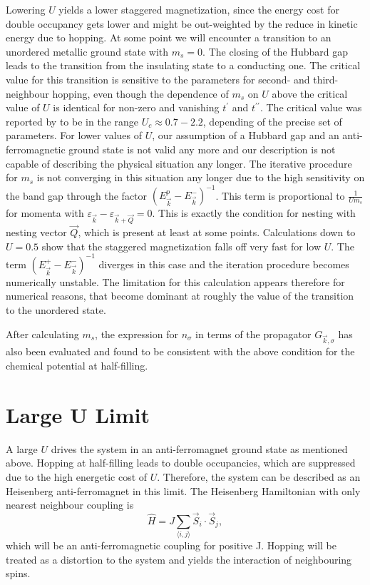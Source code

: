 Lowering $U$ yields a lower staggered magnetization, since the energy cost for double occupancy gets lower and might be out-weighted by
the reduce in kinetic energy due to hopping.
%
At some point we will encounter a transition to an unordered metallic ground state with $m_s=0$. 
The closing of the Hubbard gap leads to the transition from the insulating state to a conducting one.
The critical value for this transition is sensitive to the parameters for second- and third-neighbour hopping, 
even though the dependence of $m_s$ on $U$ above the critical value of $U$ is identical for non-zero and vanishing $t^{\prime}$ and $t^{\prime \prime}$.
The critical value was reported by \citet{PhysRevB.88.035111} to be in the range $U_c \approx 0.7 - 2.2$, depending of the precise set of parameters.
For lower values of $U$, our assumption of a Hubbard gap and an anti-ferromagnetic ground state is not valid any more
and our description is not capable of describing the physical situation any longer. 
The iterative procedure for $m_s$ is not converging in this situation any longer due to the high sensitivity on the band gap through the factor $(E^p_{\vec k} - E^-_{\vec k})^{-1}$.
This term is proportional to $\frac{1}{Um_s}$ for momenta with $\varepsilon_{\vec k} - \varepsilon_{\vec k+\vec Q} =0$.
This is exactly the condition for nesting with nesting vector $\vec Q$, which is present at least at some points.
Calculations down to $U=0.5$ show that the staggered magnetization falls off very fast for low $U$. 
The term $(E^+_{\vec k} -E^-_{\vec k})^{-1}$ diverges in this case and the iteration procedure becomes numerically unstable. 
The limitation for this calculation appears therefore for numerical reasons, that become dominant at roughly the value of the transition to the unordered state.

After calculating $m_{s}$, the expression for $n_{\sigma}$ in terms of the propagator $G_{\vec k,\sigma}$ has also been evaluated 
and found to be consistent with the above condition for the chemical potential at half-filling.



\section{Large U Limit}

A large $U$ drives the system in an anti-ferromagnet ground state as mentioned above. 
Hopping at half-filling leads to double occupancies, which are suppressed due to the high energetic cost of $U$. 
Therefore, the system can be described as an Heisenberg anti-ferromagnet in this limit.
The Heisenberg Hamiltonian with only nearest neighbour coupling is
\begin{equation}
 \hat H = J \sum_{\langle i,j\rangle} \vec{S}_i \cdot \vec{S}_j,
\end{equation}
which will be an anti-ferromagnetic coupling for positive J. 
Hopping will be treated as a distortion to the system and yields the interaction of neighbouring spins.

